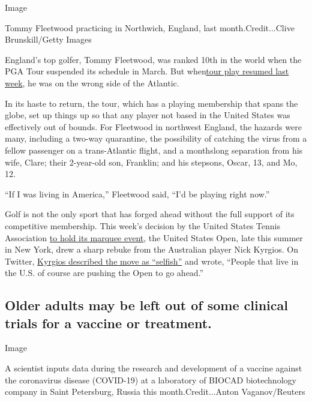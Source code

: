 Image

Tommy Fleetwood practicing in Northwich, England, last
month.Credit...Clive Brunskill/Getty Images

England's top golfer, Tommy Fleetwood, was ranked 10th in the world when
the PGA Tour suspended its schedule in March. But
when\href{https://www.nytimes3xbfgragh.onion/2020/06/11/sports/golf/pga-tour-charles-schwab.html}{tour
play resumed last week}, he was on the wrong side of the Atlantic.

In its haste to return, the tour, which has a playing membership that
spans the globe, set up things up so that any player not based in the
United States was effectively out of bounds. For Fleetwood in northwest
England, the hazards were many, including a two-way quarantine, the
possibility of catching the virus from a fellow passenger on a
trans-Atlantic flight, and a monthslong separation from his wife, Clare;
their 2-year-old son, Franklin; and his stepsons, Oscar, 13, and Mo, 12.

``If I was living in America,'' Fleetwood said, ``I'd be playing right
now.''

Golf is not the only sport that has forged ahead without the full
support of its competitive membership. This week's decision by the
United States Tennis Association
\href{https://www.nytimes3xbfgragh.onion/2020/06/15/sports/tennis/us-open.html}{to
hold its marquee event}, the United States Open, late this summer in New
York, drew a sharp rebuke from the Australian player Nick Kyrgios. On
Twitter,
\href{https://twitter.com/NickKyrgios/status/1272687984882577408?s=20}{Kyrgios
described the move as ``selfish''} and wrote, ``People that live in the
U.S. of course are pushing the Open to go ahead.''

\hypertarget{older-adults-may-be-left-out-of-some-clinical-trials-for-a-vaccine-or-treatment}{%
\subsection{Older adults may be left out of some clinical trials for a
vaccine or
treatment.}\label{older-adults-may-be-left-out-of-some-clinical-trials-for-a-vaccine-or-treatment}}

Image

A scientist inputs data during the research and development of a vaccine
against the coronavirus disease (COVID-19) at a laboratory of BIOCAD
biotechnology company in Saint Petersburg, Russia this
month.Credit...Anton Vaganov/Reuters

